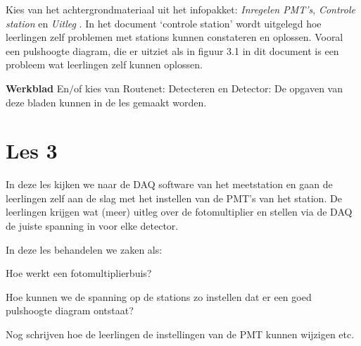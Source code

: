 Kies van het achtergrondmateriaal uit het infopakket: \textit{Inregelen
PMT's}, \textit{Controle station} en \textit{Uitleg \hisparc}. In het
document `controle station' wordt uitgelegd hoe leerlingen zelf
problemen met stations kunnen constateren en oplossen. Vooral een
pulshoogte diagram, die er uitziet als in figuur 3.1 in dit document is
een probleem wat leerlingen zelf kunnen oplossen.

\textbf{Werkblad} 
En$/$of kies van Routenet: 
Detecteren en Detector:
De opgaven van deze bladen kunnen in de les gemaakt worden.

\section{Les 3}
In deze les kijken we naar de DAQ software van het meetstation en gaan de leerlingen 
zelf aan de slag met het instellen van de PMT's van het station.
De leerlingen krijgen wat (meer) uitleg over de fotomultiplier en stellen via de DAQ
de juiste spanning in voor elke detector.


In deze les behandelen we zaken als:
\begin{description}
    \item{Hoe werkt een fotomultiplierbuis?}
    \item{Hoe kunnen we de spanning op de stations zo instellen dat er een 
    goed pulshoogte diagram ontstaat?}
\end{description}

Nog schrijven hoe de leerlingen de instellingen van de PMT kunnen wijzigen etc.


